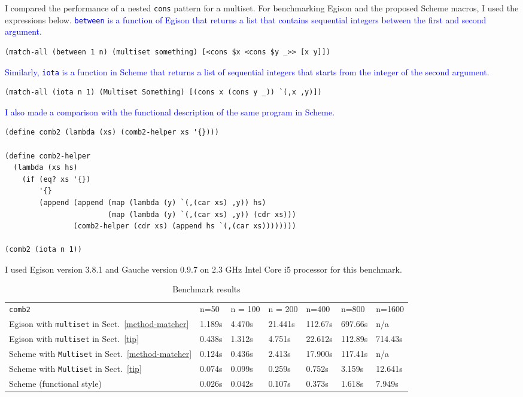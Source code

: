 \documentclass[acmlarge]{acmart}
\newcommand{\new}[1]{\textcolor{blue}{#1}}
\begin{document}
I compared the performance of a nested \texttt{cons} pattern for a multiset.
For benchmarking Egison and the proposed Scheme macros, I used the expressions below.
\new{
\texttt{between} is a function of Egison that returns a list that contains sequential integers between the first and second argument.
}%

\begin{lstlisting}[language=egison]
(match-all (between 1 n) (multiset something) [<cons $x <cons $y _>> [x y]])
\end{lstlisting}

\noindent
\new{
Similarly, \texttt{iota} is a function in Scheme that returns a list of sequential integers that starts from the integer of the second argument.
}%

\begin{lstlisting}[language=egison]
(match-all (iota n 1) (Multiset Something) [(cons x (cons y _)) `(,x ,y)])
\end{lstlisting}

\noindent
\new{
I also made a comparison with the functional description of the same program in Scheme.
}%

\begin{lstlisting}[language=egison]
(define comb2 (lambda (xs) (comb2-helper xs '{})))

(define comb2-helper
  (lambda (xs hs)
    (if (eq? xs '{})
        '{}
        (append (append (map (lambda (y) `(,(car xs) ,y)) hs)
                        (map (lambda (y) `(,(car xs) ,y)) (cdr xs)))
                (comb2-helper (cdr xs) (append hs `(,(car xs))))))))

(comb2 (iota n 1))
\end{lstlisting}

\noindent
I used Egison version 3.8.1 and Gauche version 0.9.7 on 2.3 GHz Intel Core i5 processor for this benchmark.

\begin{table}[htbp]
\begin{tabular}{|l||l|l|l|l|l|l|} \hline
\texttt{comb2} & n=50 & n = 100 & n = 200 & n=400 & n=800 & n=1600 \\ \hhline{|=#=|=|=|=|=|=|}
Egison with \texttt{multiset} in Sect.~\ref{method-matcher} & 1.189s & 4.470s & 21.441s & 112.67s & 697.66s & n/a \\ \hline
Egison with \texttt{multiset} in Sect.~\ref{tip} & 0.438s & 1.312s & 4.751s & 22.612s & 112.89s & 714.43s \\ \hline
Scheme with \texttt{Multiset} in Sect.~\ref{method-matcher} & 0.124s & 0.436s & 2.413s & 17.900s & 117.41s & n/a \\ \hline
Scheme with \texttt{Multiset} in Sect.~\ref{tip} & 0.074s & 0.099s & 0.259s & 0.752s & 3.159s & 12.641s \\ \hline
Scheme (functional style) & 0.026s & 0.042s & 0.107s & 0.373s & 1.618s & 7.949s \\ \hline
\end{tabular}
\caption{Benchmark results}
\label{table:benchmark}
\end{table}
\end{document}
